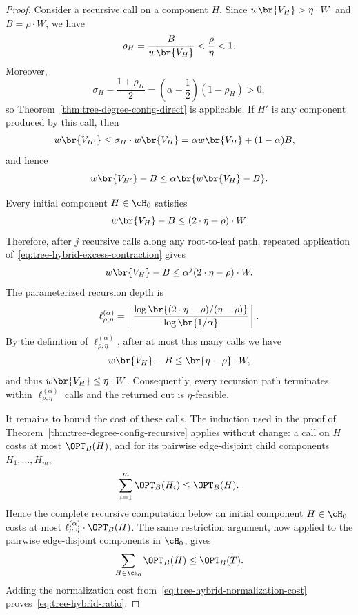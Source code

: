 \begin{proof}
    Consider a recursive call on a component $H$. Since $w\br{V_H}>\eta\cdot W$ and $B=\rho\cdot W$, we have
    \[
        \rho_H=\frac{B}{w\br{V_H}}<\frac{\rho}{\eta}<1.
    \]
    Moreover,
    \[
        \sigma_H-\frac{1+\rho_H}{2}
        =\left(\alpha-\frac12\right)(1-\rho_H)>0,
    \]
    so Theorem~\ref{thm:tree-degree-config-direct} is applicable. If $H'$ is any component produced by this call, then
    \begin{align*}
        w\br{V_{H'}}
        &\leq\sigma_H\cdot w\br{V_H}
        =\alpha w\br{V_H}+(1-\alpha)B,
    \end{align*}
    and hence
    \begin{equation}\label{eq:tree-hybrid-excess-contraction}
        w\br{V_{H'}}-B
        \leq\alpha\br{w\br{V_H}-B}.
    \end{equation}

    Every initial component $H\in\cH_0$ satisfies
    \[
        w\br{V_H}-B\leq(2\cdot\eta-\rho)\cdot W.
    \]
    Therefore, after $j$ recursive calls along any root-to-leaf path, repeated application of~\eqref{eq:tree-hybrid-excess-contraction} gives
    \[
        w\br{V_H}-B
        \leq\alpha^j
        (2\cdot\eta-\rho)\cdot W.
    \]
    The parameterized recursion depth is
    \[
        \ell^{(\alpha)}_{\rho,\eta}
        =
        \left\lceil
            \frac{
                \log\br{(2\cdot\eta-\rho)/(\eta-\rho)}
            }{
                \log\br{1/\alpha}
            }
        \right\rceil.
    \]
    By the definition of $\ell^{(\alpha)}_{\rho,\eta}$, after at most this many calls we have
    \[
        w\br{V_H}-B\leq\br{\eta-\rho}\cdot W,
    \]
    and thus $w\br{V_H}\leq\eta\cdot W$. Consequently, every recursion path terminates within $\ell^{(\alpha)}_{\rho,\eta}$ calls and the returned cut is $\eta$-feasible.

    It remains to bound the cost of these calls. The induction used in the proof of Theorem~\ref{thm:tree-degree-config-recursive} applies without change: a call on $H$ costs at most $\OPT_B(H)$, and for its pairwise edge-disjoint child components $H_1,\ldots,H_m$,
    \[
        \sum_{i=1}^{m}\OPT_B(H_i)\leq\OPT_B(H).
    \]
    Hence the complete recursive computation below an initial component $H\in\cH_0$ costs at most $\ell^{(\alpha)}_{\rho,\eta}\cdot\OPT_B(H)$. The same restriction argument, now applied to the pairwise edge-disjoint components in $\cH_0$, gives
    \[
        \sum_{H\in\cH_0}\OPT_B(H)\leq\OPT_B(T).
    \]
    Adding the normalization cost from~\eqref{eq:tree-hybrid-normalization-cost} proves~\eqref{eq:tree-hybrid-ratio}.


\end{proof}
